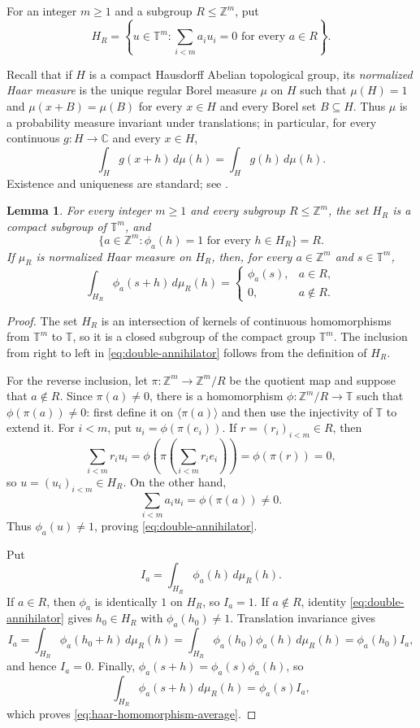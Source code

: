 \documentclass[11pt]{amsart}
\newtheorem{lemma}[theorem]{Lemma}
\theoremstyle{definition}
\newcommand{\T}{\mathbb T}
\newcommand{\Z}{\mathbb Z}
\begin{document}
For an integer $m\geq1$ and a subgroup $R\leq\Z^m$, put
\[
 H_R=\left\{u\in\T^m:\sum_{i<m}a_i u_i=0
                    \text{ for every }a\in R\right\}.
\]

Recall that if $H$ is a compact Hausdorff Abelian topological group, its
\emph{normalized Haar measure} is the unique regular Borel measure $\mu$
on $H$ such that $\mu(H)=1$ and
$\mu(x+B)=\mu(B)$ for every $x\in H$ and every Borel set $B\subseteq H$.
Thus $\mu$ is a probability measure invariant under translations; in
particular, for every continuous $g:H\to\mathbb C$ and every $x\in H$,
\[
 \int_H g(x+h)\,d\mu(h)=\int_H g(h)\,d\mu(h).
\]
Existence and uniqueness are standard; see
\cite[Chapter~VII, \S\S~2--3]{Katznelson2004}.

\begin{lemma}
\label{lem:annihilator-haar-average}
For every integer $m\geq1$ and every subgroup $R\leq\Z^m$, the set $H_R$ is
a compact subgroup of $\T^m$, and
\begin{equation}\label{eq:double-annihilator}
 \{a\in\Z^m:\phi_a(h)=1\text{ for every }h\in H_R\}=R.
\end{equation}
If $\mu_R$ is normalized Haar measure on $H_R$, then, for every
$a\in\Z^m$ and $s\in\T^m$,
\begin{equation}\label{eq:haar-homomorphism-average}
 \int_{H_R}\phi_a(s+h)\,d\mu_R(h)
 =\begin{cases}
   \phi_a(s),&a\in R,\\
   0,&a\notin R.
  \end{cases}
\end{equation}
\end{lemma}

\begin{proof}
The set $H_R$ is an intersection of kernels of continuous homomorphisms
from $\T^m$ to $\T$, so it is a closed subgroup of the compact group
$\T^m$.  The inclusion from right to left in
\eqref{eq:double-annihilator} follows from the definition of $H_R$.

For the reverse inclusion, let $\pi:\Z^m\to\Z^m/R$ be the quotient map and
suppose that $a\notin R$.  Since $\pi(a)\neq0$, there is a homomorphism
$\phi:\Z^m/R\to\T$ such that $\phi(\pi(a))\neq0$: first define it on
$\langle\pi(a)\rangle$ and then use the injectivity of $\T$ to extend it.
For $i<m$, put $u_i=\phi(\pi(e_i))$.  If $r=(r_i)_{i<m}\in R$, then
\[
 \sum_{i<m}r_i u_i
 =\phi\left(\pi\left(\sum_{i<m}r_i e_i\right)\right)
 =\phi(\pi(r))=0,
\]
so $u=(u_i)_{i<m}\in H_R$.  On the other hand,
\[
 \sum_{i<m}a_i u_i=\phi(\pi(a))\neq0.
\]
Thus $\phi_a(u)\neq1$, proving \eqref{eq:double-annihilator}.

Put
\[
 I_a=\int_{H_R}\phi_a(h)\,d\mu_R(h).
\]
If $a\in R$, then $\phi_a$ is identically $1$ on $H_R$, so $I_a=1$.  If
$a\notin R$, identity \eqref{eq:double-annihilator} gives
$h_0\in H_R$ with $\phi_a(h_0)\neq1$.  Translation invariance gives
\[
 I_a=\int_{H_R}\phi_a(h_0+h)\,d\mu_R(h)=\int_{H_R}\phi_a(h_0)\phi_a(h)\,d\mu_R(h)=\phi_a(h_0)I_a,
\]
and hence $I_a=0$.  Finally,
$\phi_a(s+h)=\phi_a(s)\phi_a(h)$, so
\[
  \int_{H_R}\phi_a(s+h)\,d\mu_R(h)=\phi_a(s)I_a,
\]
which proves \eqref{eq:haar-homomorphism-average}.
\end{proof}
\end{document}
